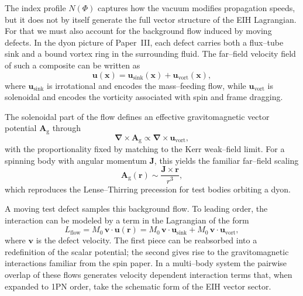 \documentclass[11pt]{article}
\begin{document}
The index profile \(N(\Phi)\) captures how the vacuum modifies propagation
speeds, but it does not by itself generate the full vector structure of the
EIH Lagrangian.  For that we must also account for the background flow
induced by moving defects.  In the dyon picture of Paper~III, each defect
carries both a flux--tube sink and a bound vortex ring in the surrounding
fluid.  The far--field velocity field of such a composite can be written as
\begin{equation}
  \mathbf{u}(\mathbf{x})
  = \mathbf{u}_{\text{sink}}(\mathbf{x})
    + \mathbf{u}_{\text{vort}}(\mathbf{x}),
\end{equation}
where \(\mathbf{u}_{\text{sink}}\) is irrotational and encodes the
mass--feeding flow, while \(\mathbf{u}_{\text{vort}}\) is solenoidal and
encodes the vorticity associated with spin and frame dragging.

The solenoidal part of the flow defines an effective gravitomagnetic vector
potential \(\mathbf{A}_{\text{g}}\) through
\begin{equation}
  \boldsymbol{\nabla} \times \mathbf{A}_{\text{g}}
  \propto \boldsymbol{\nabla} \times \mathbf{u}_{\text{vort}},
\end{equation}
with the proportionality fixed by matching to the Kerr weak--field limit.
For a spinning body with angular momentum \(\mathbf{J}\), this yields the
familiar far--field scaling
\begin{equation}
  \mathbf{A}_{\text{g}}(\mathbf{r})
  \sim \frac{\mathbf{J} \times \mathbf{r}}{r^3},
\end{equation}
which reproduces the Lense--Thirring precession for test bodies orbiting a
dyon.

A moving test defect samples this background flow.  To leading order, the
interaction can be modeled by a term in the Lagrangian of the form
\begin{equation}
  L_{\text{flow}}
  = M_0\,\mathbf{v}\cdot\mathbf{u}(\mathbf{r})
  = M_0\,\mathbf{v}\cdot\mathbf{u}_{\text{sink}}
    + M_0\,\mathbf{v}\cdot\mathbf{u}_{\text{vort}},
  \label{eq:L-flow}
\end{equation}
where \(\mathbf{v}\) is the defect velocity.  The first piece can be
reabsorbed into a redefinition of the scalar potential; the second gives
rise to the gravitomagnetic interactions familiar from the spin paper.  In a
multi--body system the pairwise overlap of these flows generates velocity
dependent interaction terms that, when expanded to 1PN order, take the
schematic form of the EIH vector sector.
\end{document}
